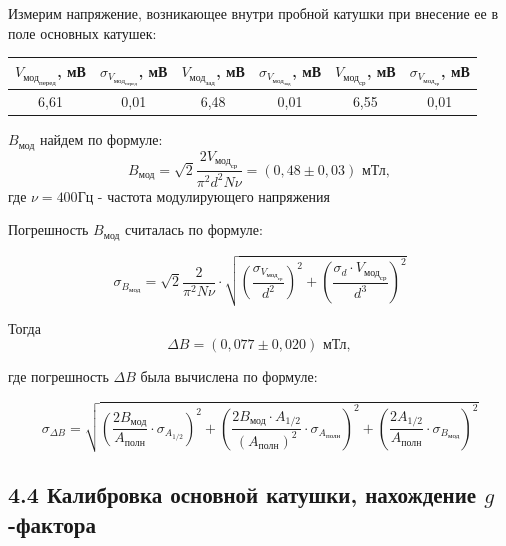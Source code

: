 \documentclass[a4paper,12pt]{report}
\begin{document}
Измерим напряжение, возникающее внутри пробной катушки при внесение ее в поле основных катушек:

\begin{table}[H]
\begin{tabular}{|c|c|c|c|c|c|}
\hline
$V_{\text{мод}_{\text{перед}}}$,   мВ & $\sigma_{V_{\text{мод}_{\text{перед}}}}$,   мВ & $V_{\text{мод}_{\text{зад}}}$, мВ & $\sigma_{V_{\text{мод}_{\text{зад}}}}$,   мВ & $V_{\text{мод}_{\text{ср}}}$, мВ & $\sigma_{V_{\text{мод}_{\text{ср}}}}$, мВ \\ \hline
6,61            & 0,01                  & 6,48        & 0,01                & 6,55       & 0,01             \\ \hline
\end{tabular}
\end{table}

$B_{\text{мод}}$ найдем по формуле:
\begin{equation*}
    B_\text{мод} = \sqrt{2} \frac{2V_{\text{мод}_\text{ср}}}{\pi^2d^2N\nu} = (0,48\pm 0,03)\text{ мТл},
\end{equation*}
где $\nu = 400$Гц - частота модулирующего напряжения %


Погрешность $B_{\text{мод}}$ считалась по формуле:

\begin{equation*}
    \sigma_{B_{\text{мод}}} = \sqrt{2} \frac{2}{\pi^2N\nu}\cdot \sqrt{(\frac{\sigma_{V_{\text{мод}_\text{ср}}}}{d^2})^2 + (\frac{\sigma_{d}\cdot V_{\text{мод}_\text{ср}}}{d^3})^2}
\end{equation*}

Тогда 
		\begin{equation*}
			\Delta B = (0,077\pm0,020) \text{ мТл},
		\end{equation*}
		
где погрешность $\Delta B$ была вычислена по формуле:

\begin{equation*}
			\sigma_{\Delta B} =  \sqrt{(\frac{2B_{\text{мод}}}{A_{\text{полн}}}\cdot \sigma_{A_{1/2}})^2 + (\frac{2B_{\text{мод}}\cdot A_{1/2}}{(A_{\text{полн}})^2}\cdot \sigma_{A_{\text{полн}}})^2 + (\frac{2A_{1/2}}{A_{\text{полн}}}\cdot \sigma_{B_{\text{мод}}})^2}
		\end{equation*}		
		
\subsection*{4.4 Калибровка основной катушки, нахождение $g$-фактора}
		
\end{document}
